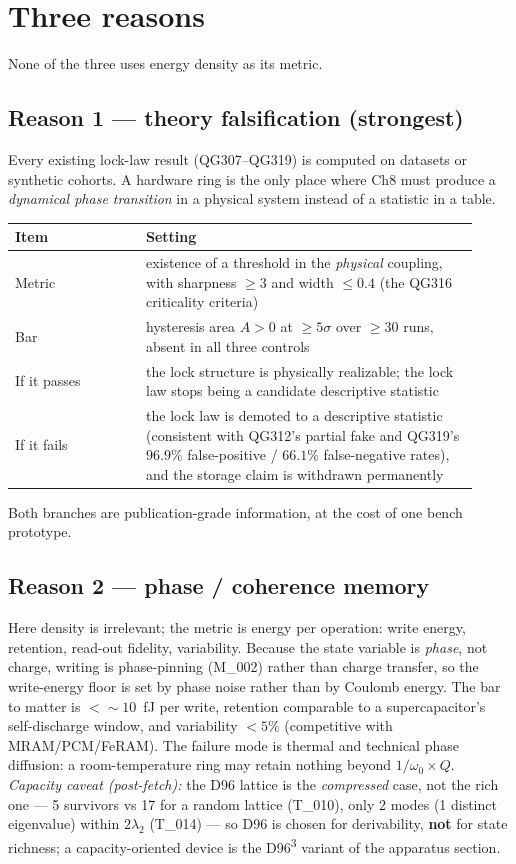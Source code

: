 \documentclass[11pt,a4paper]{article}
\newcommand{\ls}[1]{\ensuremath{\lambda_{#1}}}
\begin{document}
\section{Three reasons}

None of the three uses energy density as its metric.

\subsection{Reason 1 --- theory falsification (strongest)}
Every existing lock-law result (QG307--QG319) is computed on datasets or synthetic cohorts. A
hardware ring is the only place where Ch8 must produce a \emph{dynamical phase transition} in a
physical system instead of a statistic in a table.

\begin{table}[h]
\centering
\small
\begin{tabular}{@{}p{0.26\linewidth}p{0.66\linewidth}@{}}
\toprule
Item & Setting \\
\midrule
Metric & existence of a threshold in the \emph{physical} coupling, with sharpness $\ge 3$ and
width $\le 0.4$ (the QG316 criticality criteria) \\
Bar & hysteresis area $A>0$ at $\ge 5\sigma$ over $\ge 30$ runs, absent in all three controls \\
If it passes & the lock structure is physically realizable; the lock law stops being a candidate
descriptive statistic \\
If it fails & the lock law is demoted to a descriptive statistic (consistent with QG312's partial
fake and QG319's $96.9\%$ false-positive / $66.1\%$ false-negative rates), and the storage claim is
withdrawn permanently \\
\bottomrule
\end{tabular}
\end{table}

\noindent Both branches are publication-grade information, at the cost of one bench prototype.

\subsection{Reason 2 --- phase / coherence memory}
Here density is irrelevant; the metric is energy per operation: write energy, retention, read-out
fidelity, variability. Because the state variable is \emph{phase}, not charge, writing is
phase-pinning (M\_002) rather than charge transfer, so the write-energy floor is set by phase noise
rather than by Coulomb energy. The bar to matter is $<{\sim}10$~fJ per write, retention comparable
to a supercapacitor's self-discharge window, and variability $<5\%$ (competitive with
MRAM/PCM/FeRAM). The failure mode is thermal and technical phase diffusion: a room-temperature ring
may retain nothing beyond $1/\omega_0 \times Q$. \emph{Capacity caveat (post-fetch):} the D96 lattice
is the \emph{compressed} case, not the rich one --- 5 survivors vs 17 for a random lattice (T\_010),
only 2 modes (1 distinct eigenvalue) within $2\ls{2}$ (T\_014) --- so D96 is chosen for
derivability, \textbf{not} for state richness; a capacity-oriented device is the D96\textsuperscript{3}
variant of the apparatus section.
\end{document}
